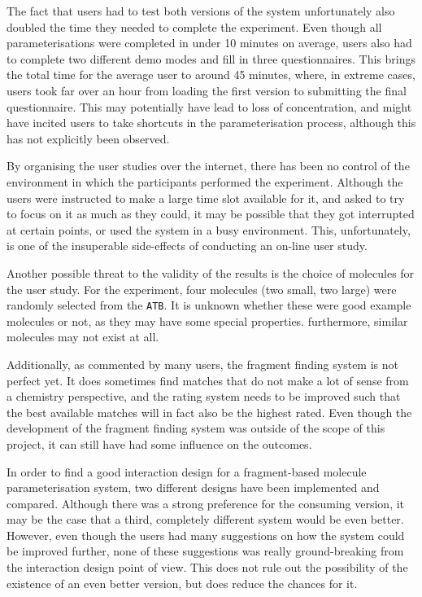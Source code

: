 The fact that users had to test both versions of the system unfortunately also doubled the time they needed to complete the experiment. Even though all parameterisations were completed in under 10 minutes on average, users also had to complete two different demo modes and fill in three questionnaires. This brings the total time for the average user to around 45 minutes, where, in extreme cases, users took far over an hour from loading the first version to submitting the final questionnaire. This may potentially have lead to loss of concentration, and might have incited users to take shortcuts in the parameterisation process, although this has not explicitly been observed.

By organising the user studies over the internet, there has been no control of the environment in which the participants performed the experiment. Although the users were instructed to make a large time slot available for it, and asked to try to focus on it as much as they could, it may be possible that they got interrupted at certain points, or used the system in a busy environment. This, unfortunately, is one of the insuperable side-effects of conducting an on-line user study.

Another possible threat to the validity of the results is the choice of molecules for the user study. For the experiment, four molecules (two small, two large) were randomly selected from the \verb|ATB|. It is unknown whether these were good example molecules or not, as they may have some special properties. furthermore, similar molecules may not exist at all.

Additionally, as commented by many users, the fragment finding system is not perfect yet. It does sometimes find matches that do not make a lot of sense from a chemistry perspective, and the rating system needs to be improved such that the best available matches will in fact also be the highest rated. Even though the development of the fragment finding system was outside of the scope of this project, it can still have had some influence on the outcomes.

In order to find a good interaction design for a fragment-based molecule parameterisation system, two different designs have been implemented and compared. Although there was a strong preference for the consuming version, it may be the case that a third, completely different system would be even better. However, even though the users had many suggestions on how the system could be improved further, none of these suggestions was really ground-breaking from the interaction design point of view. This does not rule out the possibility of the existence of an even better version, but does reduce the chances for it.

